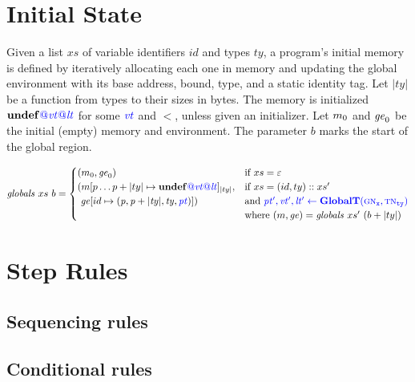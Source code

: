 \documentclass{llncs}
\begin{document}
\section{Initial State}

Given a list \(xs\) of variable identifiers \(id\) and types
\(ty\), a program's initial memory is defined by iteratively allocating each one
in memory and updating the global environment with its base address, bound, type,
and a static identity tag. Let \(|ty|\) be a function from types to their sizes
in bytes. The memory is initialized \(\mathbf{undef}{\color{blue} @}\mathit{\color{blue} vt}{\color{blue} @}\mathit{\color{blue} lt}\)
for some \(\mathit{\color{blue} vt}\) and \(\lt\), unless given an initializer.
Let \(m_0\) and \(\mathit{ge}_0\) be the initial (empty) memory and environment.
The parameter \(b\) marks the start of the global region.


\[\mathit{globals} ~ xs ~ b =
\begin{cases}
  (m_0, \mathit{ge}_0) & \textnormal{if } xs = \varepsilon \\
  (m[p \dots p+|ty| \mapsto \mathbf{undef}{\color{blue} @}\mathit{\color{blue} vt}{\color{blue} @}\mathit{\color{blue} lt}]_{|ty|}, & \textnormal{if } xs = (id,ty)::xs' \\
  ~ \mathit{ge}[id \mapsto (\mathit{p, p+|ty|,ty,\mathit{\color{blue} pt}})]) & \textnormal{and } {\color{blue} \mathit{\color{blue} pt'},\mathit{\color{blue} vt'},\mathit{\color{blue} lt'}\leftarrow \color{blue} \mathbf{GlobalT}({\color{blue} \textnormal{\sc gn}_{\mathtt{x}}}, {\color{blue} \textnormal{\sc tn}_{\mathtt{ty}}})} \\
  & \textnormal{where } (m,\mathit{ge}) = \mathit{globals} ~ xs' ~ (b + |ty|) \\
\end{cases}\]

\section{Step Rules}
\label{app:rules}

\subsection{Sequencing rules}

\sequencing

\subsection{Conditional rules}

\conditionals
\end{document}
